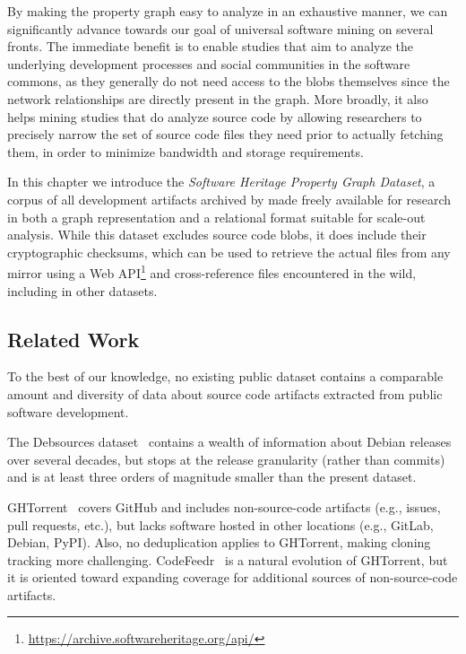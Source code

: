 By making the property graph easy to analyze in an exhaustive manner, we can
significantly advance towards our goal of universal software mining on several
fronts. The immediate benefit is to enable studies that aim to analyze the
underlying development processes and social communities in the software
commons, as they generally do not need access to the blobs themselves since the
network relationships are directly present in the graph. More broadly, it also
helps mining studies that do analyze source code by allowing researchers to
precisely narrow the set of source code files they need prior to actually
fetching them, in order to minimize bandwidth and storage requirements.

In this chapter we introduce the \emph{Software Heritage Property Graph
Dataset}, a corpus of all development artifacts archived by \SWH{} made freely
available for research in both a graph representation and a relational format
suitable for scale-out analysis.
While this dataset excludes source code blobs, it does include their
cryptographic checksums, which can be used to retrieve the actual files from
any \SWH{} mirror using a Web
API\footnote{\url{https://archive.softwareheritage.org/api/}} and
cross-reference files encountered in the wild, including in other datasets.

\subsection{Related Work}%
\label{sec:graph-dataset-related}

To the best of our knowledge, no existing public dataset contains a comparable
amount and diversity of data about source code artifacts extracted from public
software development.

The Debsources dataset~\cite{debsources-ese-2016} contains a wealth of
information about Debian releases over several decades, but stops at the
release granularity (rather than commits) and is at least three orders of
magnitude smaller than the present dataset.

GHTorrent~\cite{GHTorrent} covers GitHub and includes
non-source-code artifacts (e.g., issues, pull requests, etc.), but lacks
software hosted in other locations (e.g., GitLab, Debian, PyPI). Also, no
deduplication applies to GHTorrent, making cloning tracking more challenging.
CodeFeedr~\cite{DBLP:conf/icse/VargasHKBG18} is a natural evolution of
GHTorrent, but it is oriented toward expanding coverage for additional sources
of non-source-code artifacts.

